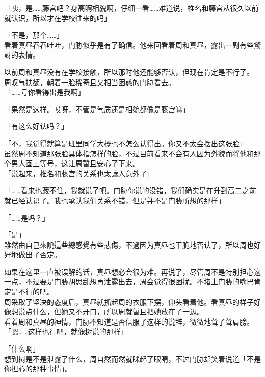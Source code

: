 「咦，是……藤宫吧？身高啊相貌啊，仔细一看……难道说，椎名和藤宫从很久以前就认识，所以才在学校往来的吗」

「不是，那个……」\\

看着真昼吞吞吐吐，门胁似乎是有了确信。他来回看着周和真昼，露出一副有些驚訝的表情。

以前周和真昼没有在学校接触，所以那时他还能够否认，但现在肯定是不行了。\\

周叹气扶额，朝着一脸稀奇且又相当困惑的门胁看去。\\

「……亏你看得出是我啊」

「果然是这样。哎呀，不管是气质还是相貌都像是藤宫嘛」

「有这么好认吗？」

「不，我觉得就算是班里同学大概也不怎么认得出。你又不太会摆出这张脸」\\

虽然周不知道那张脸具体指怎样的脸，不过目前看来不会有人因为外貌而将他和那个男人画上等号，这让周暂且安心了下来。\\

「说起来，椎名和藤宫的关系也太讓人意外了」

「……看来也藏不住，我就说了吧。门胁你说的没错，我们确实是在升到高二之前就已经认识了。我也承认我们关系不错，但是并不是门胁所想的那样」

「……是吗？」

「是」\\

雖然由自己來說這些總感覺有些悲傷，不過因为真昼也干脆地否认了，所以周也好好地做出了否定。

如果在这里一直被误解的话，真昼想必会很为难。再说了，尽管周不是特别担心这一点，不过要是门胁胡思乱想再泄露出去，周会觉得很困扰。不堵上门胁的嘴巴肯定是不行的吧。\\

周采取了坚决的态度后，真昼就抓起周的衣服下摆，仰头看着他。看真昼的样子好像想说点什么，但她又不开口，所以周就暂且把她放在了一边。\\

看着周和真昼的神情，门胁不知道是否信服了这样的说辞，微微地耸了耸肩膀。\\

「嗯……这样也行吧，就像树说的那样」

「什么啊」\\

想到树是不是泄露了什么，周自然而然就眯起了眼睛，不过门胁却笑着说道「不是你担心的那种事情」。\\

